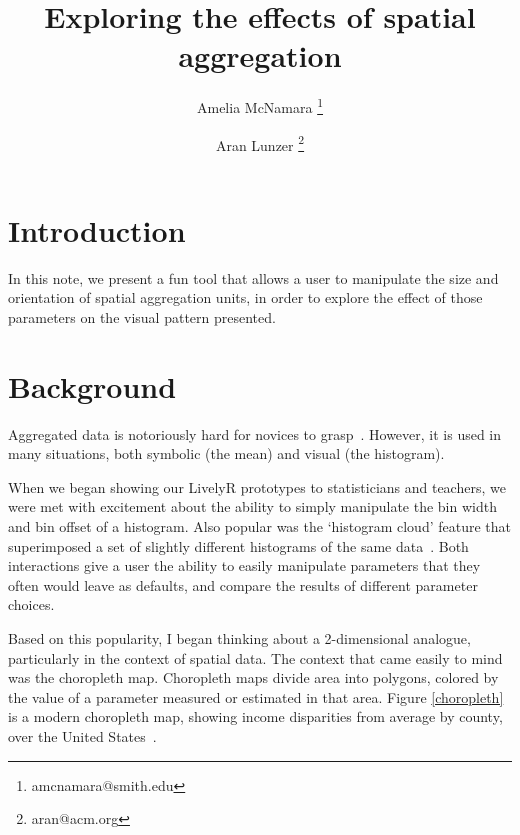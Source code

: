\documentclass{article}\usepackage[]{graphicx}\usepackage[]{color}
\begin{document}
\title{Exploring the effects of spatial aggregation}
\author[3,1]{Amelia McNamara%
\thanks{amcnamara@smith.edu}}
\author[3,2]{Aran Lunzer%
\thanks{aran@acm.org}}

\maketitle

\section{Introduction}
In this note, we present a fun tool that allows a user to manipulate the size and orientation of spatial aggregation units, in order to explore the effect of those parameters on the visual pattern presented. 

\section{Background}
Aggregated data is notoriously hard for novices to grasp~\citep{KonHigRus2014, HanKap1992}. However, it is used in many situations, both symbolic (the mean) and visual (the histogram). 

When we began showing our LivelyR prototypes to statisticians and teachers, we were met with excitement about the ability to simply manipulate the bin width and bin offset of a histogram. Also popular was the `histogram cloud' feature that superimposed a set of slightly different histograms of the same data~\citep{McN2015b}. Both interactions give a user the ability to easily manipulate parameters that they often would leave as defaults, and compare the results of different parameter choices. 

Based on this popularity, I began thinking about a 2-dimensional analogue, particularly in the context of spatial data. The context that came easily to mind was the choropleth map. Choropleth maps divide area into polygons, colored by the value of a parameter measured or estimated in that area. Figure \ref{choropleth} is a modern choropleth map, showing income disparities from average by county, over the United States~\citep{AisBut2015}. 
\end{document}

